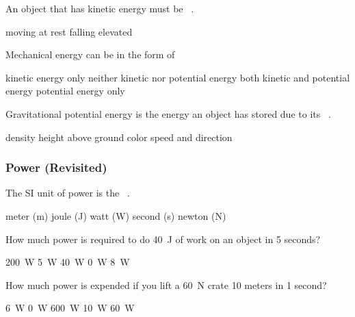 \documentclass[]{exam}
\begin{document}
\begin{questions}
\question
An object that has kinetic energy must be \fillin\ .

\begin{randomizechoices}
\correctchoice moving
\choice at rest
\choice falling
\choice elevated
\end{randomizechoices}


\question
Mechanical energy can be in the form of

\begin{randomizechoices}
\choice kinetic energy only
\choice neither kinetic nor potential energy
\correctchoice both kinetic and potential energy
\choice potential energy only
\end{randomizechoices}

\question
Gravitational potential energy is the energy an object has stored due to its \fillin\ .

\begin{randomizechoices}
\choice density
\correctchoice height above ground
\choice color
\choice speed and direction
\end{randomizechoices}


\end{questions}

\subsubsection{Power (Revisited)}

\begin{questions}
\question
The SI unit of power is the \fillin\ .

\begin{randomizechoices}
\choice meter (m)
\choice joule (J)
\correctchoice watt (W)
\choice second (s)
\choice newton (N)
\end{randomizechoices}


\question
How much power is required to do \SI{40}{J} of work on an object in 5 seconds?

\begin{randomizechoices}
\choice \SI{200}{W}
\choice \SI{5}{W}
\choice \SI{40}{W}
\choice \SI{0}{W}
\correctchoice \SI{8}{W}
\end{randomizechoices}

\question
How much power is expended if you lift a \SI{60}{N} crate 10 meters in 1 second?

\begin{randomizechoices}
\choice \SI{6}{W}
\choice \SI{0}{W}
\correctchoice \SI{600}{W}
\choice \SI{10}{W}
\choice \SI{60}{W}
\end{randomizechoices}
\end{questions}
\end{document}
